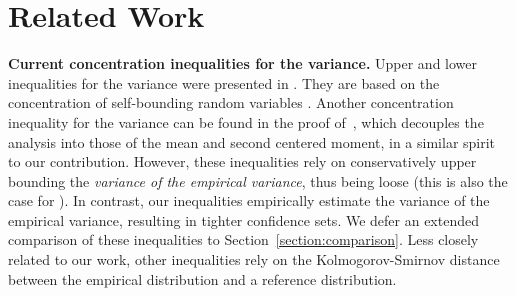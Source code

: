 \section{Related Work} \label{section:related_work}

\textbf{Current concentration inequalities for the variance.} Upper and lower inequalities for the variance were presented in \citet[Theorem 10]{maurer2009empirical}. They are based on the concentration of self-bounding random variables \citep{maurer2006concentration}. Another concentration inequality for the variance can be found in the proof of~\citet[Theorem 1]{audibert2009exploration}, which decouples the analysis into those of the mean and second centered moment, in a similar spirit to our contribution. However, these inequalities rely on conservatively upper bounding the \emph{variance of the empirical variance}, thus being loose (this is also the case  for \citet[Theorem 12]{voravcek2025star}).  In contrast, our inequalities empirically estimate the variance of the empirical variance, resulting in tighter confidence sets.  We defer an extended comparison of these inequalities to Section~\ref{section:comparison}. Less closely related to our work, other inequalities rely on the Kolmogorov-Smirnov distance between the empirical distribution and a reference distribution. %



